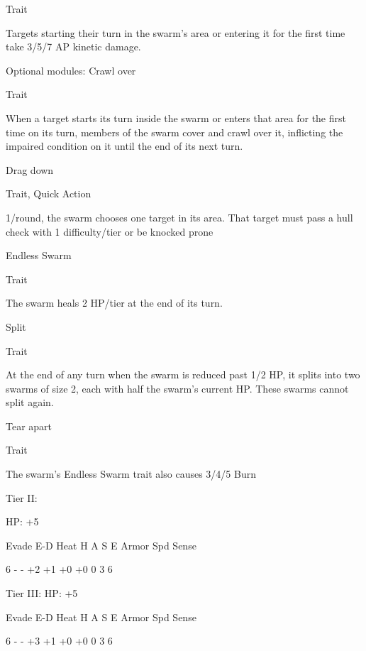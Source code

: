 Trait
 
Targets starting their turn in the swarm’s area or entering it for the first time take 3/5/7 AP kinetic  
damage.
 

                                                                                                            


Optional modules:  
Crawl over
 
Trait
 
When a target starts its turn inside the swarm or enters that area for the first time on its turn,  
members of the swarm cover and crawl over it, inflicting the impaired condition on it until the end  
of its next turn.
 

Drag down
 
Trait, Quick Action
 
1/round, the swarm chooses one target in its area. That target must pass a hull check with 1  
difficulty/tier or be knocked prone
 

Endless Swarm
 
Trait
 
The swarm heals 2 HP/tier at the end of its turn.
 

Split
 
Trait
 
At the end of any turn when the swarm is reduced past 1/2 HP, it splits into two swarms of size 2,  
each with half the swarm’s current HP. These swarms cannot split again.
 

Tear apart
 
Trait
 
The swarm’s Endless Swarm trait also causes 3/4/5 Burn
 

Tier II:
 
HP: +5
 

          Evade     E-D     Heat    H     A     S     E        Armor        Spd       Sense 

          6         -       -       +2    +1    +0    +0       0            3         6 

Tier III:  
HP: +5
 

          Evade     E-D     Heat    H     A     S     E        Armor        Spd       Sense 

          6         -       -       +3    +1    +0    +0       0            3         6 
